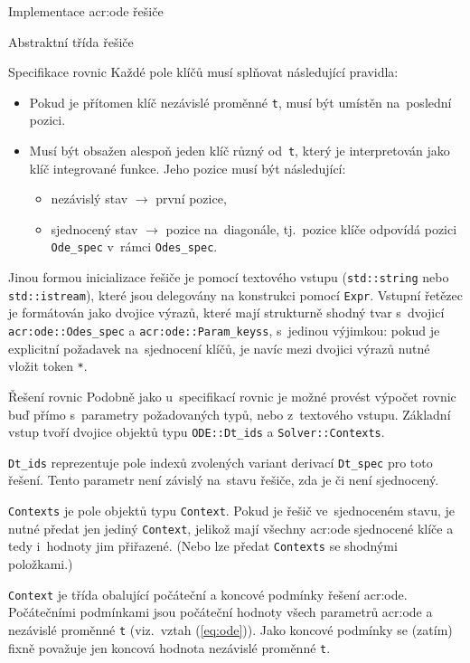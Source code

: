 \documentclass[thesis=M,czech]{FITthesis}[2012/06/26]
\newcommand{\acrlabel}[1]{acr:#1}
\newcommand{\acr}[1]{\acrshort{\acrlabel{#1}}}
\newcommand{\id}[1]{\texttt{#1}}
\newcommand{\rf}[1]{\ref{#1}}
\newcommand{\rfeq}[1]{(\rf{eq:#1})}
\begin{document}
\begin{section}{Implementace \acr{ode} řešiče}
\begin{subsection}{Abstraktní třída řešiče}
\begin{subsubsection}{Specifikace rovnic}
Každé pole klíčů musí splňovat následující pravidla:
\begin{itemize}
\item Pokud je přítomen klíč nezávislé proměnné \id{t},
   musí být umístěn na~poslední pozici.
\item Musí být obsažen alespoň jeden klíč různý od~\id{t},
   který je interpretován jako klíč integrované funkce.
   Jeho pozice musí být následující:
   \begin{itemize}
   \item nezávislý stav $\rightarrow$ první pozice,
   \item sjednocený stav  $\rightarrow$ pozice na~diagonále,
      tj.~pozice klíče odpovídá pozici \id{Ode\_\-spec}
      v~rámci \id{Odes\_\-spec}.
   \end{itemize}
\end{itemize}

Jinou formou inicializace řešiče
je pomocí textového vstupu
(\id{std::\-string} nebo \id{std::\-istream}),
které jsou delegovány na konstrukci pomocí \id{Expr}.
Vstupní řetězec je formátován jako dvojice výrazů,
které mají strukturně shodný tvar
s~dvojicí \id{\acr{ode}::\-Odes\_\-spec}
a \id{\acr{ode}::\-Param\_\-keyss},
s~jedinou výjimkou: pokud je explicitní požadavek
na~sjednocení klíčů, je navíc mezi dvojici výrazů
nutné vložit token \id{*}.
\end{subsubsection} %


\begin{subsubsection}{Řešení rovnic}\label{sss:impl:ode:solver:solve}
Podobně jako u~specifikací rovnic
je možné provést výpočet rovnic
buď přímo s~parametry požadovaných typů,
nebo z~textového vstupu.
Základní vstup tvoří dvojice objektů
typu \id{ODE::\-Dt\_\-ids} a \id{Solver::\-Contexts}.

\id{Dt\_\-ids} reprezentuje pole indexů
zvolených variant derivací \id{Dt\_\-spec}
pro toto řešení.
Tento parametr není závislý na~stavu řešiče,
zda je či není sjednocený.

\id{Contexts} je pole objektů typu \id{Context}.
Pokud je řešič ve~sjednoceném stavu,
je nutné předat jen jediný \id{Context},
jelikož mají všechny \acr{ode} sjednocené klíče
a tedy i~hodnoty jim přiřazené.
(Nebo lze předat \id{Contexts} se shodnými položkami.)


\begin{paragraph}{\id{Context}}\label{p:impl:ode:solver:solve:ctx}
je třída obalující počáteční a koncové podmínky
řešení \acr{ode}.
Počátečními podmínkami
jsou počáteční hodnoty všech parametrů \acr{ode}
a nezávislé proměnné \id{t}
(viz.~vztah \rfeq{ode}).
Jako koncové podmínky se (zatím)
fixně považuje jen koncová hodnota
nezávislé proměnné \id{t}.


\end{paragraph}
\end{subsubsection}
\end{subsection}
\end{section}
\end{document}
